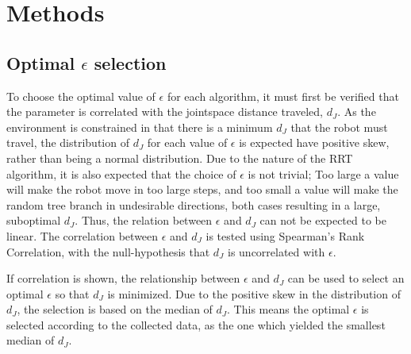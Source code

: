 \section{Methods}
\subsection{Optimal \(\epsilon\) selection}
To choose the optimal value of \(\epsilon\) for each algorithm,
it must first be verified that the parameter is correlated
with the jointspace distance traveled, \(d_J\).
As the environment is constrained in that there is a minimum \(d_J\)
that the robot must travel, the distribution of \(d_J\) for each
value of \(\epsilon\) is expected have positive skew,
rather than being a normal distribution.
Due to the nature of the RRT algorithm, it is also expected that
the choice of \(\epsilon\) is not trivial;
Too large a value will make the robot move in too large steps,
and too small a value will make the random tree branch in
undesirable directions, both cases resulting in a large, suboptimal \(d_J\).
Thus, the relation between \(\epsilon\) and \(d_J\) can not be expected to be linear.
The correlation between \(\epsilon\) and \(d_J\) is tested using
Spearman's Rank Correlation, with the null-hypothesis that \(d_J\)
is uncorrelated with \(\epsilon\).

If correlation is shown, the relationship
between \(\epsilon\) and \(d_J\) can be used
to select an optimal \(\epsilon\) so that
\(d_J\) is minimized.
Due to the positive skew in the distribution
of \(d_J\), the selection is based on the median
of \(d_J\).
This means the optimal \(\epsilon\) is selected
according to the collected data,
as the one which yielded the smallest median of \(d_J\).